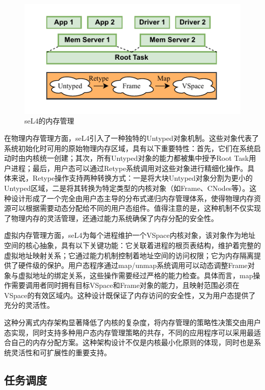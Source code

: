\begin{figure}[htbp]
  \centering
  \includegraphics[width=1.0\textwidth]{figures/seL4_mm.drawio.pdf}
  \caption{seL4的内存管理}\label{fig:seL4_mm}
\end{figure}

在物理内存管理方面，seL4引入了一种独特的Untyped对象机制。这些对象代表了系统初始化时可用的原始物理内存区域，具有以下重要特性：首先，它们在系统启动时由内核统一创建；其次，所有Untyped对象的能力都被集中授予Root Task用户进程；最后，用户态可以通过Retype系统调用对这些对象进行精细化操作。具体来说，Retype操作支持两种转换方式：一是将大块Untyped对象分割为更小的Untyped区域，二是将其转换为特定类型的内核对象（如Frame、CNodes等）。这种设计形成了一个完全由用户态主导的分布式递归内存管理体系，使得物理内存资源可以根据需要动态分配给不同的用户态组件。值得注意的是，这种机制不仅实现了物理内存的灵活管理，还通过能力系统确保了内存分配的安全性。

虚拟内存管理方面，seL4为每个进程维护一个VSpace内核对象，该对象作为地址空间的核心抽象，具有以下关键功能：它关联着进程的根页表结构，维护着完整的虚拟地址映射关系；它通过能力机制控制着地址空间的访问权限；它为内存隔离提供了硬件级的保护。用户态程序通过map/unmap系统调用可以动态调整Frame对象与虚拟地址的绑定关系，这些操作需要经过严格的能力检查。具体而言，map操作需要调用者同时拥有目标VSpace和Frame对象的能力，且映射范围必须在VSpace的有效区域内。这种设计既保证了内存访问的安全性，又为用户态提供了充分的灵活性。

这种分离式内存架构显著降低了内核的复杂度，将内存管理的策略性决策交由用户态实现，同时支持多种用户态内存管理策略的共存，不同的应用程序可以采用最适合自己的内存分配方案。这种架构设计不仅是内核最小化原则的体现，同时也是系统灵活性和可扩展性的重要支持。


\subsection{任务调度}
\label{sec:sel4_task}

